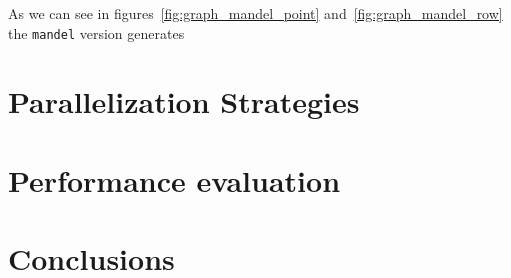 
As we can see in figures~\ref{fig:graph_mandel_point} and~\ref{fig:graph_mandel_row} the \texttt{mandel} version generates %



\section{Parallelization Strategies}%
\label{sec:Parallelization Strategies}



\section{Performance evaluation}%
\label{sec:Performance evaluation}


\section{Conclusions}%
\label{sec:Conclusions}




